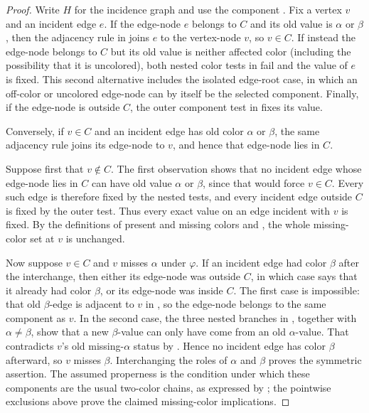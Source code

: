\begin{proof}
Write \(H\) for the incidence graph
 and use the component
.  Fix a vertex \(v\) and an incident edge
\(e\).  If the edge-node \(e\) belongs to \(C\) and its old value is
\(\alpha\) or \(\beta\), then the adjacency rule in
 joins \(e\) to the vertex-node \(v\),
so \(v\in C\).  If instead the edge-node belongs to \(C\) but its old
value is neither affected color (including the possibility that it is
uncolored), both nested color tests in
 fail and the value of \(e\) is fixed.
This second alternative includes the isolated edge-root case, in which
an off-color or uncolored edge-node can by itself be the selected
component.  Finally, if the edge-node is outside \(C\), the outer
component test in  fixes its value.

Conversely, if \(v\in C\) and an incident edge has old color
\(\alpha\) or \(\beta\), the same adjacency rule joins its edge-node to
\(v\), and hence that edge-node lies in \(C\).

Suppose first that \(v\notin C\).  The first observation shows that no
incident edge whose edge-node lies in \(C\) can have old value
\(\alpha\) or \(\beta\), since that would force \(v\in C\).  Every such
edge is therefore fixed by the nested tests, and every incident edge
outside \(C\) is fixed by the outer test.  Thus every exact value on an
edge incident with \(v\) is fixed.  By the definitions of present and
missing colors
 and , the whole
missing-color set at \(v\) is unchanged.

Now suppose \(v\in C\) and \(v\) misses \(\alpha\) under \(\varphi\).
If an incident edge had color \(\beta\) after the interchange, then
either its edge-node was outside \(C\), in which case
 says that it already had color
\(\beta\), or its edge-node was inside \(C\).  The first case is
impossible: that old \(\beta\)-edge is adjacent to \(v\) in
, so the edge-node belongs to the same
component as \(v\).  In the second case, the three nested branches in
, together with
\(\alpha\ne\beta\), show that a new \(\beta\)-value can only have come
from an old \(\alpha\)-value.  That contradicts \(v\)'s old
missing-\(\alpha\) status by .  Hence no
incident edge has color \(\beta\) afterward, so \(v\) misses
\(\beta\).  Interchanging the roles of \(\alpha\) and \(\beta\) proves
the symmetric assertion.  The assumed properness is the condition under
which these components are the usual two-color chains, as expressed by
; the pointwise exclusions above prove the
claimed missing-color implications.


\end{proof}

